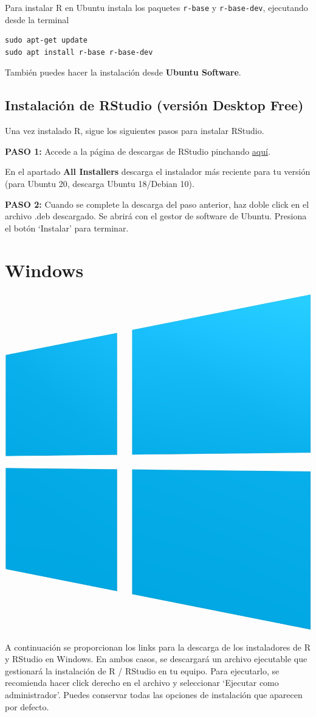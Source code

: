 \documentclass[]{book}
\begin{document}
Para instalar R en Ubuntu instala los paquetes \texttt{r-base} y \texttt{r-base-dev}, ejecutando desde la terminal

\begin{verbatim}
sudo apt-get update
sudo apt install r-base r-base-dev 
\end{verbatim}

También puedes hacer la instalación desde \textbf{Ubuntu Software}.

\hypertarget{instalaciuxf3n-de-rstudio-versiuxf3n-desktop-free}{%
\section{Instalación de RStudio (versión Desktop Free)}\label{instalaciuxf3n-de-rstudio-versiuxf3n-desktop-free}}

Una vez instalado R, sigue los siguientes pasos para instalar RStudio.

\textbf{PASO 1: }
Accede a la página de descargas de RStudio pinchando \href{https://rstudio.com/products/rstudio/download/\#download}{aquí}.

En el apartado \textbf{All Installers} descarga el instalador más reciente para tu versión (para Ubuntu 20, descarga Ubuntu 18/Debian 10).

\textbf{PASO 2: }
Cuando se complete la descarga del paso anterior, haz doble click en el archivo .deb descargado. Se abrirá con el gestor de software de Ubuntu. Presiona el botón `Instalar' para terminar.

\hypertarget{windows}{%
\chapter{Windows}\label{windows}}

\begin{center}\includegraphics[width=0.15\linewidth]{images/os/windows} \end{center}

A continuación se proporcionan los links para la descarga de los instaladores de R y RStudio en Windows. En ambos casos, se descargará un archivo ejecutable que gestionará la instalación de R / RStudio en tu equipo. Para ejecutarlo, se recomienda hacer click derecho en el archivo y seleccionar `Ejecutar como administrador'. Puedes conservar todas las opciones de instalación que aparecen por defecto.
\end{document}
